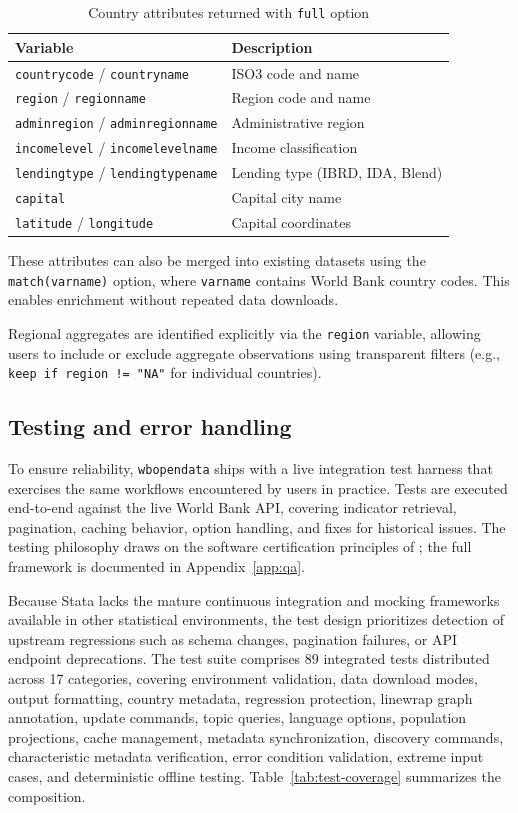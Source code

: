 \documentclass[bib]{statapress}
\begin{document}
\begin{table}[H]
\centering
\caption{Country attributes returned with \texttt{full} option}
\label{tab:attributes}
\begin{tabular}{ll}
\hline
Variable & Description \\
\hline
\texttt{countrycode} / \texttt{countryname} & ISO3 code and name \\
\texttt{region} / \texttt{regionname} & Region code and name \\
\texttt{adminregion} / \texttt{adminregionname} & Administrative region \\
\texttt{incomelevel} / \texttt{incomelevelname} & Income classification \\
\texttt{lendingtype} / \texttt{lendingtypename} & Lending type (IBRD, IDA, Blend) \\
\texttt{capital} & Capital city name \\
\texttt{latitude} / \texttt{longitude} & Capital coordinates \\
\hline
\end{tabular}
\end{table}

These attributes can also be merged into existing datasets using the
\texttt{match(varname)} option, where \texttt{varname} contains World Bank
country codes. This enables enrichment without repeated data downloads.

Regional aggregates are identified explicitly via the \texttt{region} variable,
allowing users to include or exclude aggregate observations using transparent
filters (e.g., \texttt{keep if region != "NA"} for individual countries).

\subsection{Testing and error handling}

To ensure reliability, \texttt{wbopendata} ships with a live integration test
harness that exercises the same workflows encountered by users in practice.
Tests are executed end-to-end against the live World Bank API, covering
indicator retrieval, pagination, caching behavior, option handling, and fixes
for historical issues. The testing philosophy draws on the software
certification principles of \citet{gould2001certification}; the full
framework is documented in Appendix~\ref{app:qa}.

Because Stata lacks the mature continuous integration and mocking frameworks
available in other statistical environments, the test design prioritizes
detection of upstream regressions such as schema changes, pagination failures,
or API endpoint deprecations. The test suite comprises 89 integrated tests
distributed across 17 categories, covering environment validation, data download
modes, output formatting, country metadata, regression protection, linewrap
graph annotation, update commands, topic queries, language options, population
projections, cache management, metadata synchronization, discovery commands,
characteristic metadata verification, error condition validation, extreme input
cases, and deterministic offline testing.
Table~\ref{tab:test-coverage} summarizes the composition.
\end{document}

